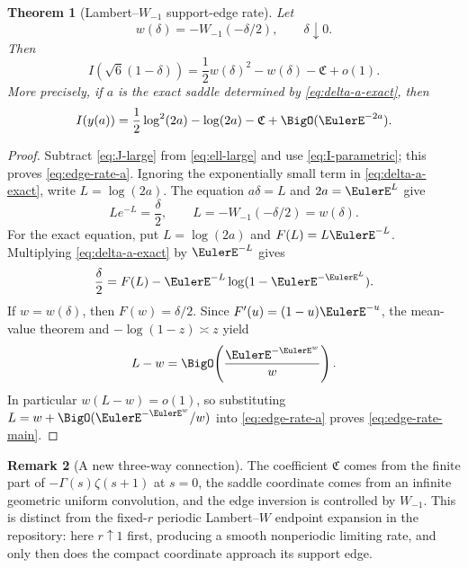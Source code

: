 \documentclass[11pt]{article}
\numberwithin{equation}{section}
\newtheorem{theorem}{Theorem}[section]
\theoremstyle{definition}
\newtheorem{remark}[theorem]{Remark}
\begin{document}
\begin{theorem}[Lambert--\(W_{-1}\) support-edge rate]\label{thm:rate-edge}
Let
\begin{equation}\label{eq:wdelta}
 w(\delta)=-W_{-1}(-\delta/2),\qquad \delta\downarrow0.
\end{equation}
Then
\begin{equation}\label{eq:edge-rate-main}
 \boxed{
 I\!\left(\sqrt6(1-\delta)\right)
 =\frac12w(\delta)^2-w(\delta)-\mathfrak C+o(1).}
\end{equation}
More precisely, if \(a\) is the exact saddle determined by \eqref{eq:delta-a-exact}, then
\begin{equation}\label{eq:edge-rate-a}
 I(y(a))=\frac12\log^2(2a)-\log(2a)-\mathfrak C+\BigO(\EulerE^{-2a}).
\end{equation}
\end{theorem}

\begin{proof}
Subtract \eqref{eq:J-large} from \eqref{eq:ell-large} and use \eqref{eq:I-parametric}; this proves \eqref{eq:edge-rate-a}.  Ignoring the exponentially small term in \eqref{eq:delta-a-exact}, write \(L=\log(2a)\).  The equation \(a\delta=L\) and \(2a=\EulerE^L\) give
\[
 Le^{-L}=\frac\delta2,
 \qquad
 L=-W_{-1}(-\delta/2)=w(\delta).
\]
For the exact equation, put \(L=\log(2a)\) and \(F(L)=L\EulerE^{-L}\).  Multiplying \eqref{eq:delta-a-exact} by \(\EulerE^{-L}\) gives
\[
 \frac{\delta}{2}=F(L)-\EulerE^{-L}\log(1-\EulerE^{-\EulerE^L}).
\]
If \(w=w(\delta)\), then \(F(w)=\delta/2\).  Since \(F'(u)=(1-u)\EulerE^{-u}\), the mean-value theorem and \(-\log(1-z)\asymp z\) yield
\begin{equation}\label{eq:L-w-sharp}
 L-w=\BigO\!\left(\frac{\EulerE^{-\EulerE^w}}{w}\right).
\end{equation}
In particular \(w(L-w)=o(1)\), so substituting \(L=w+\BigO(\EulerE^{-\EulerE^w}/w)\) into \eqref{eq:edge-rate-a} proves \eqref{eq:edge-rate-main}.
\end{proof}

\begin{remark}[A new three-way connection]
The coefficient \(\mathfrak C\) comes from the finite part of \(-\Gamma(s)\zeta(s+1)\) at \(s=0\), the saddle coordinate comes from an infinite geometric uniform convolution, and the edge inversion is controlled by \(W_{-1}\).  This is distinct from the fixed-\(r\) periodic Lambert--\(W\) endpoint expansion in the repository: here \(r\uparrow1\) first, producing a smooth nonperiodic limiting rate, and only then does the compact coordinate approach its support edge.
\end{remark}
\end{document}
